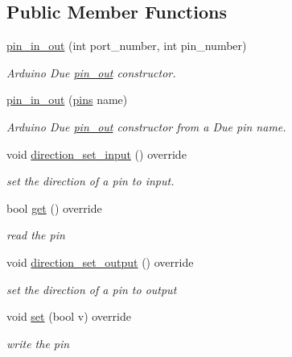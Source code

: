\subsection*{Public Member Functions}
\begin{DoxyCompactItemize}
\item 
\hyperlink{classdue_1_1pin__in__out_a12f008036b3594228749c70f45cbdf9a}{pin\+\_\+in\+\_\+out} (int port\+\_\+number, int pin\+\_\+number)
\begin{DoxyCompactList}\small\item\em Arduino Due \hyperlink{classdue_1_1pin__out}{pin\+\_\+out} constructor. \end{DoxyCompactList}\item 
\hyperlink{classdue_1_1pin__in__out_a228da28eb609b180235db2a0ed249469}{pin\+\_\+in\+\_\+out} (\hyperlink{namespacedue_a8ffa3ec309934ff9db34317e504bcc92}{pins} name)
\begin{DoxyCompactList}\small\item\em Arduino Due \hyperlink{classdue_1_1pin__out}{pin\+\_\+out} constructor from a Due pin name. \end{DoxyCompactList}\item 
void \hyperlink{classdue_1_1pin__in__out_a2ca0c81a7e1059a171c997d5015d99ea}{direction\+\_\+set\+\_\+input} () override
\begin{DoxyCompactList}\small\item\em set the direction of a pin to input. \end{DoxyCompactList}\item 
bool \hyperlink{classdue_1_1pin__in__out_a09142f62d25f903475be52da0b3fe8a9}{get} () override
\begin{DoxyCompactList}\small\item\em read the pin \end{DoxyCompactList}\item 
void \hyperlink{classdue_1_1pin__in__out_a45f7cf2e7f71638337f82ecf1852f884}{direction\+\_\+set\+\_\+output} () override
\begin{DoxyCompactList}\small\item\em set the direction of a pin to output \end{DoxyCompactList}\item 
void \hyperlink{classdue_1_1pin__in__out_ad3a74cb13af59d4a5be3cc40a8f894b8}{set} (bool v) override
\begin{DoxyCompactList}\small\item\em write the pin \end{DoxyCompactList}\end{DoxyCompactItemize}


